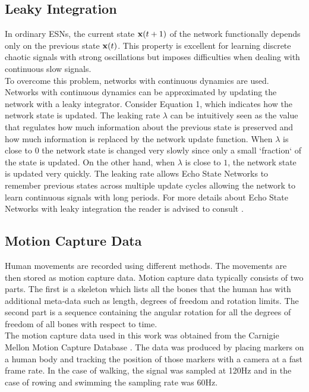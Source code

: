 \documentclass[letterpaper,9pt]{article}
\begin{document}
\subsection{Leaky Integration}

In ordinary ESNs, the current state ${\bf x}(t+1)$ of the network functionally depends only on the previous state ${\bf x}(t)$. This property is excellent for learning discrete chaotic signals with strong oscillations but imposes difficulties when dealing with continuous slow signals.\\

To overcome this problem, networks with continuous dynamics are used. Networks with continuous dynamics can be approximated by updating the network with a leaky integrator. Consider Equation 1, which indicates how the network state is updated. The leaking rate $\lambda$ can be intuitively seen as the value that regulates how much information about the previous state is preserved and how much information is replaced by the network update function. When $\lambda$ is close to $0$ the network state is changed very slowly since only a small `fraction` of the state is updated. On the other hand, when $\lambda$ is close to $1$, the network state is updated very quickly. The leaking rate allows Echo State Networks to remember previous states across multiple update cycles allowing the network to learn continuous signals with long periods. For more details about Echo State Networks with leaky integration the reader is advised to consult \cite{JaegerESNTutorial}.

\subsection{Motion Capture Data}

Human movements are recorded using different methods. The movements are then stored as motion capture data. Motion capture data typically consists of two parts. The first is a skeleton which lists all the bones that the human has with additional meta-data such as length, degrees of freedom and rotation limits. The second part is a sequence containing the angular rotation for all the degrees of freedom of all bones with respect to time.\\

The motion capture data used in this work was obtained from the Carnigie Mellon Motion Capture Database \cite{CMUMocap}. The data was produced by placing markers on a human body and tracking the position of those markers with a camera at a fast frame rate. In the case of walking, the signal was sampled at 120Hz and in the case of rowing and swimming the sampling rate was 60Hz. 
\end{document}
